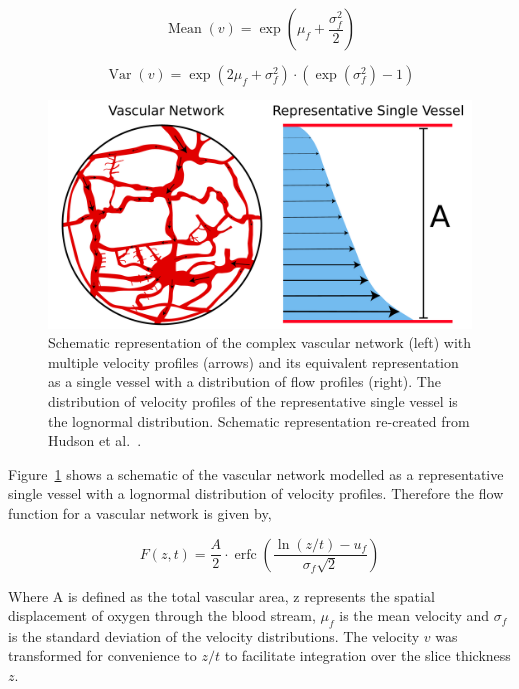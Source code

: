 \begin{equation}
\operatorname{Mean}(v)=\exp \left(\mu_{f}+\frac{\sigma_{f}^{2}}{2}\right)
\end{equation}

\begin{equation}
\operatorname{Var}(v)=\exp \left(2 \mu_{f}+\sigma_{f}^{2}\right)\cdot \left(\exp \left(\sigma_{f}^{2}\right)-1\right)
\end{equation}

\begin{figure}[htbp]
   \centering
   \includegraphics[width=\textwidth]{oemri_thesis2/oemri_thesis2-images/tumourVasculature.pdf} %
   \caption{Schematic representation of the complex vascular network (left) with multiple velocity profiles (arrows) and its equivalent representation as a single vessel with a distribution of flow profiles (right). The distribution of velocity profiles of the representative single vessel is the lognormal distribution. Schematic representation re-created from Hudson et al.~\cite{Hudson:2009jv}.}
   \label{lognormal}
\end{figure}

Figure~\ref{lognormal} shows a schematic of the vascular network modelled as a representative single vessel with a lognormal distribution of velocity profiles.
Therefore the flow function for a vascular network is given by,

\begin{equation}
F(z, t)=\frac{A}{2} \cdot \operatorname{erfc}\left(\frac{\ln (z / t)-u_{f}}{\sigma_{f} \sqrt{2}}\right)
\end{equation}

Where A is defined as the total vascular area, z represents the spatial displacement of oxygen through the blood stream, $\mu_f$ is the mean velocity and $\sigma_f$ is the standard deviation of the velocity distributions. 
The velocity $v$ was transformed for convenience to $z/t$ to facilitate integration over the slice thickness $z$.


